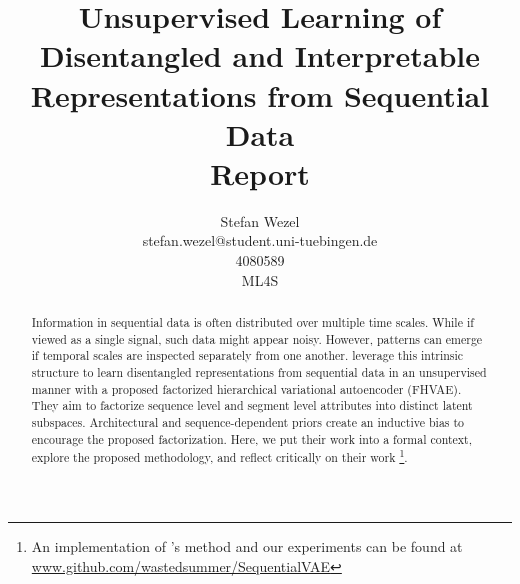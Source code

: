 \documentclass{article} %
\title{Unsupervised Learning of Disentangled and Interpretable Representations from Sequential Data\\ \vspace{0.5cm}\large{Report}}
\author{Stefan Wezel \\ stefan.wezel@student.uni-tuebingen.de \\4080589  \\ ML4S}
\def\figwidth{.5\linewidth}
\def\figheight{.15\textheight}
\begin{document}
\maketitle

\begin{abstract}

%



Information in sequential data is often distributed over multiple time scales.
While if viewed as a single signal, such data might appear noisy. However, patterns can emerge if temporal scales are inspected separately from one another.
\citet{hsu2017unsupervised} leverage this intrinsic structure to learn disentangled representations from sequential data in an unsupervised manner with a proposed factorized hierarchical variational autoencoder (FHVAE). They aim to factorize sequence level and segment level attributes into distinct latent subspaces. Architectural and sequence-dependent priors create an inductive bias to encourage the proposed factorization. Here, we put their work into a formal context, explore the proposed methodology, and reflect critically on their work \footnote{An implementation of \citet{hsu2017unsupervised}'s method and our experiments can be found at \url{www.github.com/wastedsummer/SequentialVAE}}.
\end{abstract}
\end{document}
